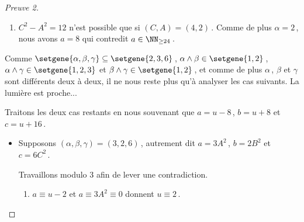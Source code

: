 \begin{proof}[Preuve 2]
\begin{itemize}
\begin{enumerate}
			
			\item $C^2 - A^2 = 12$ n'est possible que si $(C, A) = (4, 2)$\,.
			Comme de plus $\alpha = 2$\,, nous avons $a = 8$ qui contredit $a \in \NN_{\geq 24}$\,.
		\end{enumerate}
	\end{itemize}


	\medskip
	
	Comme
	$\setgene{\alpha, \beta, \gamma} \subseteq \setgene{2, 3, 6}$\,,
	$\alpha \wedge \beta \in \setgene{1, 2}$\,,
	$\alpha \wedge \gamma \in \setgene{1, 2, 3}$ et
	$\beta \wedge \gamma \in \setgene{1, 2}$\,,
	et comme de plus $\alpha$\,, $\beta$ et $\gamma$ sont différents deux à deux, il ne nous reste plus qu'à analyser les cas suivants.
	La lumière est proche...

	\begin{center}
	\end{center}


	Traitons les deux cas restants en nous souvenant que $a = u - 8$\,, $b = u + 8$ et $c = u + 16$\,.
	
	\begin{itemize}
		\item Supposons $(\alpha, \beta, \gamma) = (3, 2, 6)$\,, 
		autrement dit 
		$a = 3 A^2$\,, $b = 2 B^2$ et $c = 6 C^2$\,.
		
		\smallskip
		\noindent
		Travaillons modulo $3$ afin de lever une contradiction.
		\begin{enumerate}			
			\item $a \equiv u - 2$ et $a \equiv 3 A^2 \equiv 0$ donnent $u \equiv 2$\,.
			

\end{enumerate}
\end{itemize}
\end{proof}
